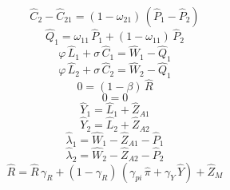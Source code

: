 \begin{dmath}
{{\hat{C}_{2}}}-{{\hat{C}_{2 1}}}=\left(1-{{\omega_{21}}}\right)\, \left({{\hat{P}_{1}}}-{{\hat{P}_{2}}}\right)
\end{dmath}
\begin{dmath}
{{\hat{Q}_{1}}}={{\omega_{11}}}\, {{\hat{P}_{1}}}+\left(1-{{\omega_{11}}}\right)\, {{\hat{P}_{2}}}
\end{dmath}
\begin{dmath}
{{\varphi}}\, {{\hat{L}_{1}}}+{{\sigma}}\, {{\hat{C}_{1}}}={{\hat{W}_{1}}}-{{\hat{Q}_{1}}}
\end{dmath}
\begin{dmath}
{{\varphi}}\, {{\hat{L}_{2}}}+{{\sigma}}\, {{\hat{C}_{2}}}={{\hat{W}_{2}}}-{{\hat{Q}_{1}}}
\end{dmath}
\begin{dmath}
0=\left(1-{{\beta}}\right)\, {{\hat{R}}}
\end{dmath}
\begin{dmath}
0=0
\end{dmath}
\begin{dmath}
{{\hat{Y}_{1}}}={{\hat{L}_{1}}}+{{\hat{Z}_{A1}}}
\end{dmath}
\begin{dmath}
{{\hat{Y}_{2}}}={{\hat{L}_{2}}}+{{\hat{Z}_{A2}}}
\end{dmath}
\begin{dmath}
{{\hat{\lambda}_{1}}}={{\hat{W}_{1}}}-{{\hat{Z}_{A1}}}-{{\hat{P}_{1}}}
\end{dmath}
\begin{dmath}
{{\hat{\lambda}_{2}}}={{\hat{W}_{2}}}-{{\hat{Z}_{A2}}}-{{\hat{P}_{2}}}
\end{dmath}
\begin{dmath}
{{\hat{R}}}={{\hat{R}}}\, {{\gamma_{R}}}+\left(1-{{\gamma_{R}}}\right)\, \left({{\gamma_{pi}}}\, {{\hat{\pi}}}+{{\gamma_{Y}}}\, {{\hat{Y}}}\right)+{{\hat{Z}_M}}
\end{dmath}
